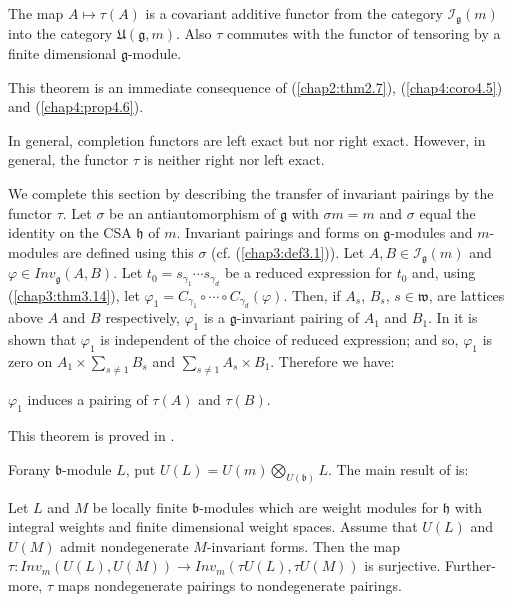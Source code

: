 \begin{theorem}\label{chap4:thm4.8}
The map $A \mapsto \tau (A)$ is a covariant additive functor from the
category $\mathscr{I}_\mathfrak{g}(m)$ into the category
$\mathfrak{U}(\mathfrak{g}, m)$. Also $\tau$ commutes with the functor
of tensoring by a finite dimensional $\mathfrak{g}$-module.
\end{theorem}


This theorem is an immediate consequence of (\ref{chap2:thm2.7}),
(\ref{chap4:coro4.5}) and (\ref{chap4:prop4.6}). 

\medskip
{}
In general, completion functors are left exact but nor right
exact. However, in general, the functor $\tau$ is neither right nor
left exact. 

We complete this section by describing the transfer of invariant
pairings by the functor $\tau$. Let $\sigma$ be an antiautomorphism of
$\mathfrak{g}$ with $\sigma m = m$ and $\sigma$ equal the identity on
the CSA $\mathfrak{h}$ of $m$. Invariant pairings and forms on
$\mathfrak{g}$-modules and $m$-modules are defined using this $\sigma$
(cf. (\ref{chap3:def3.1})). Let $A,B \in \mathscr{I}_\mathfrak{g}(m)$ and $\varphi
\in Inv_\mathfrak{g}(A,B)$. Let $t_0 = s_{\gamma_1} \cdots
s_{\gamma_d}$ be a reduced expression for $t_0$ and, using (\ref{chap3:thm3.14}), let
$\varphi_1 = C_{\gamma_1} \circ \cdots \circ
C_{\gamma_d}(\varphi)$. Then, if $A_s$, $B_s$, $s \in \mathfrak{w}$,
are lattices above $A$ and $B$ respectively, $\varphi_1$ is a
$\mathfrak{g}$-invariant pairing of $A_1$ and $B_1$. In \cite{key17}
it is shown that $\varphi_1$ is independent of the choice of reduced
expression; and so, $\varphi_1$ is zero on $A_1 \times \sum\limits_{s
  \neq 1} B_s$ and $\sum\limits_{s \neq 1} A_s \times B_1$. Therefore
we have:

\setcounter{prop}{9}
\begin{theorem}\label{chap4:thm4.10}
$\varphi_1$ induces a pairing of $\tau(A)$ and $\tau(B)$.
\end{theorem}

This theorem is proved in \cite{key17}.

For\pageoriginale any $\mathfrak{b}$-module $L$, put $U(L) = U(m)
\bigotimes\limits_{U(\mathfrak{b})} L$. The main result of \cite{key17}
is:

\begin{prop}\label{chap4:prop4.11}
Let $L$ and $M$ be locally finite $\mathfrak{b}$-modules which are
weight modules for $\mathfrak{h}$ with integral weights and finite
dimensional weight spaces. Assume that $U(L)$ and $U(M)$ admit
nondegenerate $M$-invariant forms. Then the map $\tau:Inv_m(U(L),
U(M)) \to Inv_m (\tau U(L), \tau U(M))$ is surjective. Further-more,
$\tau$ maps nondegenerate pairings to nondegenerate pairings. 
\end{prop}

